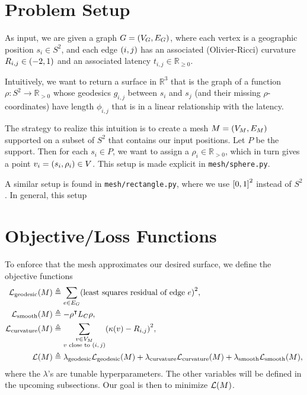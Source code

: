 \documentclass[10pt]{article}
\newcommand*\delimeter[3]{
	\ensuremath{\mathopen{}\left#2 #1\right#3\mathclose{}{\vphantom{\left#2 #1\right#3}}}
}
\newcommand*\pof[1]{\delimeter{#1}{(}{)}}
\newcommand*\ooint[1]{\delimeter{#1}{(}{)}}
\newcommand*\ccint[1]{\delimeter{#1}{[}{]}}
\begin{document}
	\pagestyle{empty}

	\section{Problem Setup}

	As input, we are given a graph \(G = \pof{V_G, E_G}\), where each vertex is a geographic position \(s_i \in S^2\), and each edge \(\pof{i, j}\) has an associated (Olivier-Ricci) curvature \(R_{i, j} \in \ooint{-2, 1}\) and an associated latency \(t_{i, j} \in \mathbb{R}_{\ge 0}\).

	Intuitively, we want to return a surface in \(\mathbb{R}^3\) that is the graph of a function \(\rho : S^2 \to \mathbb{R}_{> 0}\) whose geodesics \(g_{i, j}\) between \(s_i\) and \(s_j\) (and their missing \(\rho\)-coordinates) have length \(\phi_{i, j}\) that is in a linear relationship with the latency.

	The strategy to realize this intuition is to create a mesh \(M = \pof{V_M, E_M}\) supported on a subset of \(S^2\) that contains our input positions. Let \(P\) be the support. Then for each \(s_i \in P\), we want to assign a \(\rho_i \in \mathbb{R}_{> 0}\), which in turn gives a point \(v_i = \pof{s_i, \rho_i} \in V\). This setup is made explicit in \texttt{mesh/sphere.py}.

	A similar setup is found in \texttt{mesh/rectangle.py}, where we use \(\ccint{0, 1}^2\) instead of \(S^2\). In general, this setup 

	\section{Objective/Loss Functions}

	To enforce that the mesh approximates our desired surface, we define the objective functions \begin{align*}
		\mathcal{L}_{\mathrm{geodesic}}\pof{M} &\triangleq \sum_{e \in E_G} \pof{\text{least squares residual of edge \(e\)}}^2, \\
		\mathcal{L}_{\mathrm{smooth}}\pof{M} &\triangleq -\rho^\intercal L_C\rho, \\
		\mathcal{L}_{\mathrm{curvature}}\pof{M} &\triangleq \sum_{\substack{v \in V_M \\ \text{\(v\) close to \(\pof{i, j}\)}}} \pof{\kappa\pof{v} - R_{i, j}}^2, \\
		\mathcal{L}\pof{M} &\triangleq \lambda_{\mathrm{geodesic}}\mathcal{L}_{\mathrm{geodesic}}\pof{M} + \lambda_{\mathrm{curvature}}\mathcal{L}_{\mathrm{curvature}}\pof{M} + \lambda_{\mathrm{smooth}}\mathcal{L}_{\mathrm{smooth}}\pof{M},
	\end{align*} where the \(\lambda\)'s are tunable hyperparameters. The other variables will be defined in the upcoming subsections. Our goal is then to minimize \(\mathcal{L}\pof{M}\).
\end{document}
